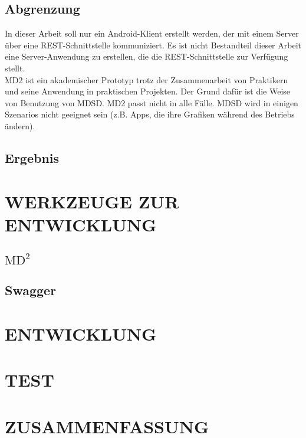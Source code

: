 \documentclass[a4paper,twoside]{article}
\begin{document}
\subsection{Abgrenzung}
In dieser Arbeit soll nur ein Android-Klient erstellt werden, der mit einem Server \"uber eine REST-Schnittstelle kommuniziert. Es ist nicht Bestandteil dieser Arbeit eine Server-Anwendung zu erstellen, die die REST-Schnittstelle zur Verf\"ugung stellt.\\
MD2 ist ein akademischer Prototyp trotz der Zusammenarbeit von  
Praktikern und seine Anwendung in praktischen Projekten. Der Grund 
dafür ist die Weise von Benutzung von MDSD. MD2 passt nicht in alle Fälle. MDSD wird in einigen Szenarios nicht geeignet sein (z.B. Apps, die ihre Grafiken während des Betriebs ändern).


\subsection{Ergebnis}


\section{\uppercase{Werkzeuge zur Entwicklung}}

\subsection{$\text{MD}^2$}

\subsection{Swagger}

\section{\uppercase{Entwicklung}}

\section{\uppercase{Test}}

\section{\uppercase{Zusammenfassung}}

\vfill
\end{document}
